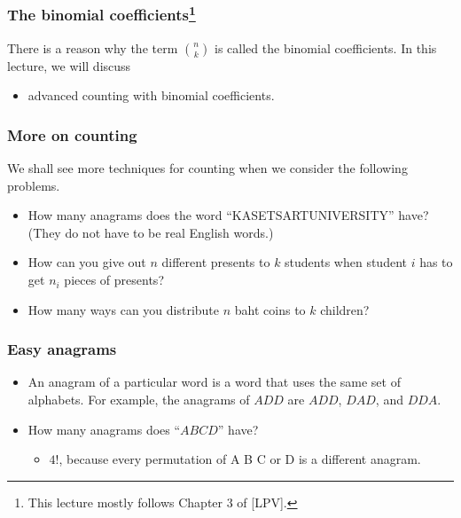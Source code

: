 

\begin{frame}\frametitle{The binomial coefficients\footnote{This lecture mostly follows Chapter 3 of [LPV].}}
  There is a reason why the term $\binom{n}{k}$ is called the binomial
  coefficients.  In this lecture, we will discuss
  \begin{itemize}
  \item advanced counting with binomial coefficients.
  \end{itemize}
\end{frame}

\begin{frame}\frametitle{More on counting}
  We shall see more techniques for counting when we consider the
  following problems.
  \begin{itemize}
  \item How many anagrams does the word ``KASETSARTUNIVERSITY'' have?
    (They do not have to be real English words.)
  \item How can you give out $n$ different presents to $k$ students
    when student $i$ has to get $n_i$ pieces of presents?
  \item How many ways can you distribute $n$ baht coins to $k$
    children?
  \end{itemize}
\end{frame}

\begin{frame}\frametitle{Easy anagrams}
  \begin{itemize}
  \item An anagram of a particular word is a word that uses the same
    set of alphabets.  For example, the anagrams of $ADD$ are $ADD$,
    $DAD$, and $DDA$. \pause
  \item How many anagrams does ``$ABCD$'' have? \pause
    \begin{itemize}
    \item $4!$, because every permutation of A B C or D is a different
      anagram. \pause
    \end{itemize}
  \end{itemize}
\end{frame}

